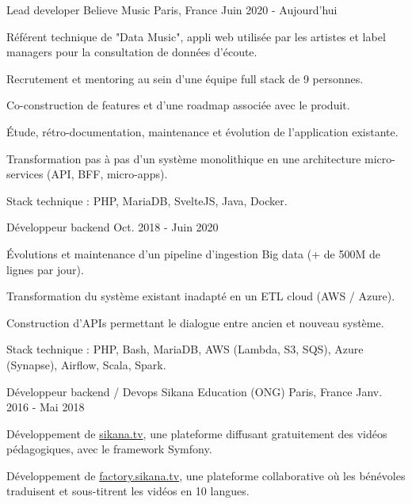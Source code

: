 \begin{cventries}
  \cventry
    {Lead developer}
    {Believe Music}
    {Paris, France}
    {Juin 2020 - Aujourd'hui}
    {
      \begin{cvitems}
        \item {Référent technique de "Data Music", appli web utilisée par les artistes et label managers pour la consultation de données d'écoute.}
        \item {Recrutement et mentoring au sein d'une équipe full stack de 9 personnes.}
        \item {Co-construction de features et d'une roadmap associée avec le produit.}
        \item {Étude, rétro-documentation, maintenance et évolution de l'application existante.}
        \item {Transformation pas à pas d'un système monolithique en une architecture micro-services (API, BFF, micro-apps).}
        \item {Stack technique : PHP, MariaDB, SvelteJS, Java, Docker.}
      \end{cvitems}
      \vspace{-2.0mm}
    }
  \cventry
    {Développeur backend}
    {}
    {}
    {Oct. 2018 - Juin 2020}
    {
      \begin{cvitems}
        \item {Évolutions et maintenance d'un pipeline d'ingestion Big data (+ de 500M de lignes par jour).}
        \item {Transformation du système existant inadapté en un ETL cloud (AWS / Azure).}
        \item {Construction d'APIs permettant le dialogue entre ancien et nouveau système.}
        \item {Stack technique : PHP, Bash, MariaDB, AWS (Lambda, S3, SQS), Azure (Synapse), Airflow, Scala, Spark.}
      \end{cvitems}
    }
  \cventry
    {Développeur backend / Devops}
    {Sikana Education (ONG)}
    {Paris, France}
    {Janv. 2016 - Mai 2018}
    {
      \begin{cvitems}
        \item {Développement de \href{https://sikana.tv}{sikana.tv}, une plateforme diffusant gratuitement des vidéos pédagogiques, avec le framework Symfony.}
        \item {Développement de \href{https://factory.sikana.tv}{factory.sikana.tv}, une plateforme collaborative où les bénévoles traduisent et sous-titrent les vidéos en 10 langues.}

\end{cvitems}}
\end{cventries}

